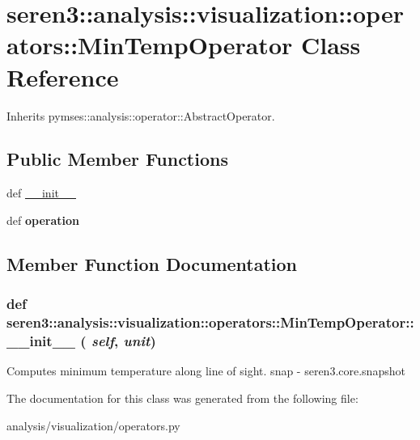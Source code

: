 \hypertarget{classseren3_1_1analysis_1_1visualization_1_1operators_1_1MinTempOperator}{
\section{seren3::analysis::visualization::operators::MinTempOperator Class Reference}
\label{classseren3_1_1analysis_1_1visualization_1_1operators_1_1MinTempOperator}
}


Inherits pymses::analysis::operator::AbstractOperator.\subsection*{Public Member Functions}
\begin{DoxyCompactItemize}
\item 
def \hyperlink{classseren3_1_1analysis_1_1visualization_1_1operators_1_1MinTempOperator_a22853ff981c6f5d770c47192e3a9e956}{\_\-\_\-init\_\-\_\-}
\item 
\hypertarget{classseren3_1_1analysis_1_1visualization_1_1operators_1_1MinTempOperator_ac8c33be57f0b711a5efd87a8f79b0040}{
def {\bfseries operation}}
\label{classseren3_1_1analysis_1_1visualization_1_1operators_1_1MinTempOperator_ac8c33be57f0b711a5efd87a8f79b0040}

\end{DoxyCompactItemize}


\subsection{Member Function Documentation}
\hypertarget{classseren3_1_1analysis_1_1visualization_1_1operators_1_1MinTempOperator_a22853ff981c6f5d770c47192e3a9e956}{
\subsubsection[{\_\-\_\-init\_\-\_\-}]{\setlength{\rightskip}{0pt plus 5cm}def seren3::analysis::visualization::operators::MinTempOperator::\_\-\_\-init\_\-\_\- ( {\em self}, \/   {\em unit})}}
\label{classseren3_1_1analysis_1_1visualization_1_1operators_1_1MinTempOperator_a22853ff981c6f5d770c47192e3a9e956}
\begin{DoxyVerb}
Computes minimum temperature along line of sight.
snap - seren3.core.snapshot
\end{DoxyVerb}
 

The documentation for this class was generated from the following file:\begin{DoxyCompactItemize}
\item 
analysis/visualization/operators.py\end{DoxyCompactItemize}

